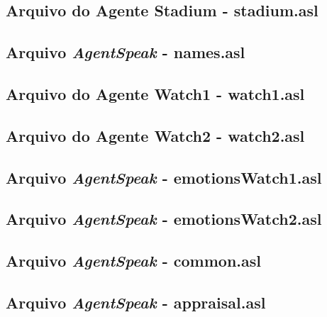 \subsection*{Arquivo do Agente Stadium - stadium.asl}


\subsection*{Arquivo \emph{AgentSpeak} - names.asl}


\subsection*{Arquivo do Agente Watch1 - watch1.asl}


\subsection*{Arquivo do Agente Watch2 - watch2.asl}


\subsection*{Arquivo \emph{AgentSpeak} - emotionsWatch1.asl}


\subsection*{Arquivo \emph{AgentSpeak} - emotionsWatch2.asl}


\subsection*{Arquivo \emph{AgentSpeak} - common.asl}


\subsection*{Arquivo \emph{AgentSpeak} - appraisal.asl}



